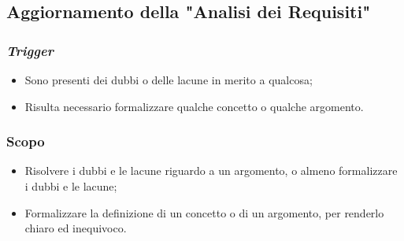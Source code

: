 \subsection{Aggiornamento della "Analisi dei Requisiti"}
\label{aggiornare-adr}

\subsubsection{\textit{Trigger}}
\begin{itemize}
	\item Sono presenti dei dubbi o delle lacune in merito a qualcosa;

	\item Risulta necessario formalizzare qualche concetto o qualche argomento.
\end{itemize}

\subsubsection{Scopo}
\begin{itemize}
	\item Risolvere i dubbi e le lacune riguardo a un argomento, o almeno
	      formalizzare i dubbi e le lacune;

	\item Formalizzare la definizione di un concetto o di un argomento, per
	      renderlo chiaro ed inequivoco.
\end{itemize}

